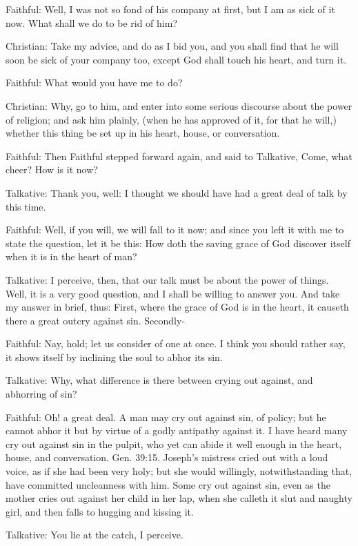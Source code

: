Faithful: Well, I was not so fond of his company at first, but I am as sick of it now. What shall we do to be rid of him?

Christian: Take my advice, and do as I bid you, and you shall find that he will soon be sick of your company too, except God shall touch his heart, and turn it.

Faithful: What would you have me to do?

Christian: Why, go to him, and enter into some serious discourse about the power of religion; and ask him plainly, (when he has approved of it, for that he will,) whether this thing be set up in his heart, house, or conversation.

Faithful: Then Faithful stepped forward again, and said to Talkative, Come, what cheer? How is it now?

Talkative: Thank you, well: I thought we should have had a great deal of talk by this time.

Faithful: Well, if you will, we will fall to it now; and since you left it with me to state the question, let it be this: How doth the saving grace of God discover itself when it is in the heart of man?

Talkative: I perceive, then, that our talk must be about the power of things. Well, it is a very good question, and I shall be willing to answer you. And take my answer in brief, thus: First, where the grace of God is in the heart, it causeth there a great outcry against sin. Secondly-

Faithful: Nay, hold; let us consider of one at once. I think you should rather say, it shows itself by inclining the soul to abhor its sin.

Talkative: Why, what difference is there between crying out against, and abhorring of sin?

Faithful: Oh! a great deal. A man may cry out against sin, of policy; but he cannot abhor it but by virtue of a godly antipathy against it. I have heard many cry out against sin in the pulpit, who yet can abide it well enough in the heart, house, and conversation. Gen. 39:15. Joseph's mistress cried out with a loud voice, as if she had been very holy; but she would willingly, notwithstanding that, have committed uncleanness with him. Some cry out against sin, even as the mother cries out against her child in her lap, when she calleth it slut and naughty girl, and then falls to hugging and kissing it.

Talkative: You lie at the catch, I perceive.

